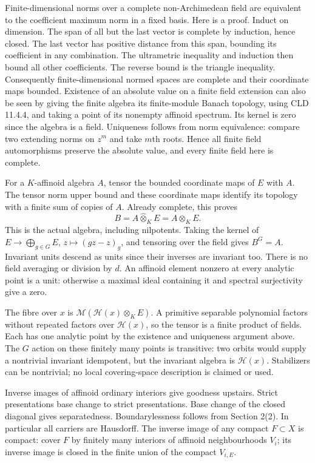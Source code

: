 \documentclass[
  11pt,
]{article}
\begin{document}
Finite-dimensional norms over a complete non-Archimedean field are
equivalent to the coefficient maximum norm in a fixed basis. Here is a
proof. Induct on dimension. The span of all but the last vector is
complete by induction, hence closed. The last vector has positive
distance from this span, bounding its coefficient in any combination.
The ultrametric inequality and induction then bound all other
coefficients. The reverse bound is the triangle inequality. Consequently
finite-dimensional normed spaces are complete and their coordinate maps
bounded. Existence of an absolute value on a finite field extension can
also be seen by giving the finite algebra its finite-module Banach
topology, using CLD 11.4.4, and taking a point of its nonempty affinoid
spectrum. Its kernel is zero since the algebra is a field. Uniqueness
follows from norm equivalence: compare two extending norms on \(z^m\)
and take \(m\)th roots. Hence all finite field automorphisms preserve
the absolute value, and every finite field here is complete.

For a \(K\)-affinoid algebra \(A\), tensor the bounded coordinate maps
of \(E\) with \(A\). The tensor norm upper bound and these coordinate
maps identify its topology with a finite sum of copies of \(A\). Already
complete, this proves \[
             B=A\widehat\otimes_K E=A\otimes_K E.        \tag{5}
\] This is the actual algebra, including nilpotents. Taking the kernel
of \(E\to\bigoplus_{g\in G}E\), \(z\mapsto(gz-z)_g\), and tensoring over
the field gives \(B^G=A\). Invariant units descend as units since their
inverses are invariant too. There is no field averaging or division by
\(d\). An affinoid element nonzero at every analytic point is a unit:
otherwise a maximal ideal containing it and spectral surjectivity give a
zero.

The fibre over \(x\) is \(\mathcal M(\mathcal H(x)\otimes_K E)\). A
primitive separable polynomial factors without repeated factors over
\(\mathcal H(x)\), so the tensor is a finite product of fields. Each has
one analytic point by the existence and uniqueness argument above. The
\(G\) action on these finitely many points is transitive: two orbits
would supply a nontrivial invariant idempotent, but the invariant
algebra is \(\mathcal H(x)\). Stabilizers can be nontrivial; no local
covering-space description is claimed or used.

Inverse images of affinoid ordinary interiors give goodness upstairs.
Strict presentations base change to strict presentations. Base change of
the closed diagonal gives separatedness. Boundarylessness follows from
Section 2(2). In particular all carriers are Hausdorff. The inverse
image of any compact \(F\subset X\) is compact: cover \(F\) by finitely
many interiors of affinoid neighbourhoods \(V_i\); its inverse image is
closed in the finite union of the compact \(V_{i,E}\).
\end{document}
